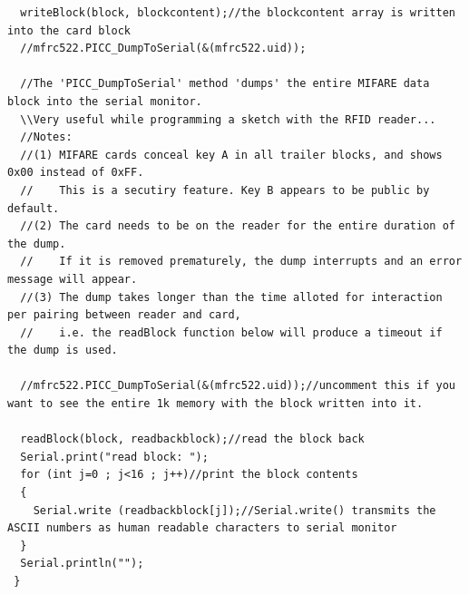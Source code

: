 \documentclass[a4paper, 11pt]{article}           %
\begin{document}
\begin{lstlisting}
  writeBlock(block, blockcontent);//the blockcontent array is written into the card block
  //mfrc522.PICC_DumpToSerial(&(mfrc522.uid));

  //The 'PICC_DumpToSerial' method 'dumps' the entire MIFARE data block into the serial monitor.
  \\Very useful while programming a sketch with the RFID reader...
  //Notes:
  //(1) MIFARE cards conceal key A in all trailer blocks, and shows 0x00 instead of 0xFF.
  //    This is a secutiry feature. Key B appears to be public by default.
  //(2) The card needs to be on the reader for the entire duration of the dump.
  //    If it is removed prematurely, the dump interrupts and an error message will appear.
  //(3) The dump takes longer than the time alloted for interaction per pairing between reader and card,
  //    i.e. the readBlock function below will produce a timeout if the dump is used.

  //mfrc522.PICC_DumpToSerial(&(mfrc522.uid));//uncomment this if you want to see the entire 1k memory with the block written into it.

  readBlock(block, readbackblock);//read the block back
  Serial.print("read block: ");
  for (int j=0 ; j<16 ; j++)//print the block contents
  {
    Serial.write (readbackblock[j]);//Serial.write() transmits the ASCII numbers as human readable characters to serial monitor
  }
  Serial.println("");
 }

\end{lstlisting}

\end{document}
